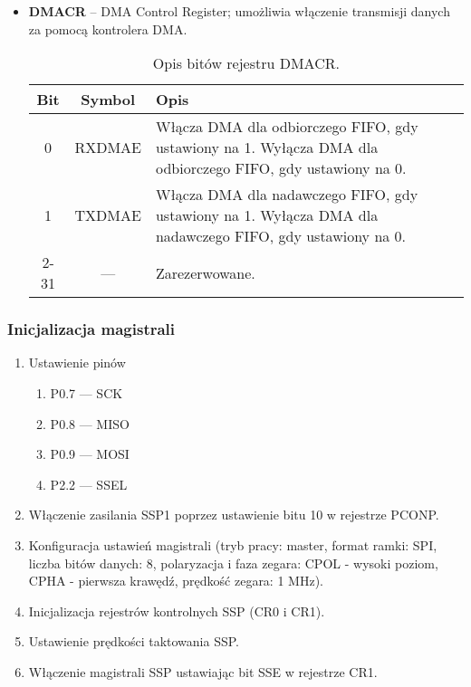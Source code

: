 \begin{itemize}
  \item \textbf{DMACR} – DMA Control Register; umożliwia włączenie transmisji danych za pomocą kontrolera DMA.

\begin{table}[H]
\centering
\caption{Opis bitów rejestru DMACR.}
\vspace{0.5em}
\renewcommand{\arraystretch}{1.2}
\begin{tabular}{|c|c|p{10cm}|}
\hline
\textbf{Bit} & \textbf{Symbol} & \textbf{Opis} \\
\hline
0 & RXDMAE & Włącza DMA dla odbiorczego FIFO, gdy ustawiony na 1. Wyłącza DMA dla odbiorczego FIFO, gdy ustawiony na 0. \\
\hline
1 & TXDMAE & Włącza DMA dla nadawczego FIFO, gdy ustawiony na 1. Wyłącza DMA dla nadawczego FIFO, gdy ustawiony na 0. \\
\hline
2-31 & — & Zarezerwowane. \\
\hline
\end{tabular}
\end{table}

  
\end{itemize}

\subsubsection{Inicjalizacja magistrali}
\begin{enumerate}
    \item Ustawienie pinów
    \begin{enumerate}
        \item P0.7 — SCK
        \item P0.8 — MISO
        \item P0.9 — MOSI
        \item P2.2 — SSEL
    \end{enumerate}
    \item Włączenie zasilania SSP1 poprzez ustawienie bitu 10 w rejestrze PCONP.
    \item Konfiguracja ustawień magistrali (tryb pracy: master, format ramki: SPI, liczba bitów danych: 8, polaryzacja i faza zegara: CPOL - wysoki poziom, CPHA - pierwsza krawędź, prędkość zegara: 1 MHz).
    \item Inicjalizacja rejestrów kontrolnych SSP (CR0 i CR1).
    \item Ustawienie prędkości taktowania SSP.
    \item Włączenie magistrali SSP ustawiając bit SSE w rejestrze CR1.
\end{enumerate}

